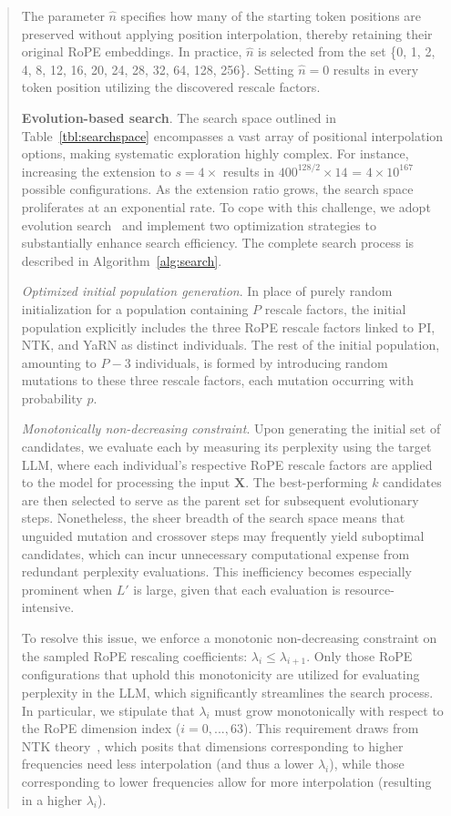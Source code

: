\begin{abstract}
The parameter $\hat{n}$ specifies how many of the starting token positions are preserved without applying position interpolation, thereby retaining their original RoPE embeddings. In practice, $\hat{n}$ is selected from the set \{0, 1, 2, 4, 8, 12, 16, 20, 24, 28, 32, 64, 128, 256\}. Setting $\hat{n}=0$ results in every token position utilizing the discovered rescale factors.

\textbf{Evolution-based search}. The search space outlined in Table~\ref{tbl:searchspace} encompasses a vast array of positional interpolation options, making systematic exploration highly complex. For instance, increasing the extension to $s=4\times$ results in $400^{128/2}\times14$ = $4\times10^{167}$ possible configurations. As the extension ratio grows, the search space proliferates at an exponential rate. To cope with this challenge, we adopt evolution search~\cite{guo2020single} and implement two optimization strategies to substantially enhance search efficiency. The complete search process is described in Algorithm~\ref{alg:search}.

\textit{Optimized initial population generation}. In place of purely random initialization for a population containing $P$ rescale factors, the initial population explicitly includes the three RoPE rescale factors linked to PI, NTK, and YaRN as distinct individuals. The rest of the initial population, amounting to $P-3$ individuals, is formed by introducing random mutations to these three rescale factors, each mutation occurring with probability $p$.

\textit{Monotonically non-decreasing constraint}. Upon generating the initial set of candidates, we evaluate each by measuring its perplexity using the target LLM, where each individual's respective RoPE rescale factors are applied to the model for processing the input $\mathbf{X}$. The best-performing $k$ candidates are then selected to serve as the parent set for subsequent evolutionary steps. Nonetheless, the sheer breadth of the search space means that unguided mutation and crossover steps may frequently yield suboptimal candidates, which can incur unnecessary computational expense from redundant perplexity evaluations. This inefficiency becomes especially prominent when $L'$ is large, given that each evaluation is resource-intensive.

To resolve this issue, we enforce a monotonic non-decreasing constraint on the sampled RoPE rescaling coefficients: $\lambda_i \leq \lambda_{i+1}$. Only those RoPE configurations that uphold this monotonicity are utilized for evaluating perplexity in the LLM, which significantly streamlines the search process. In particular, we stipulate that $\lambda_i$ must grow monotonically with respect to the RoPE dimension index ($i=0,...,63$). This requirement draws from NTK theory~\cite{jacot2018neural,tancik2020fourier,ntk}, which posits that dimensions corresponding to higher frequencies need less interpolation (and thus a lower $\lambda_i$), while those corresponding to lower frequencies allow for more interpolation (resulting in a higher $\lambda_i$).


\end{abstract}
